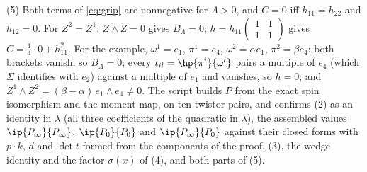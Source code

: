 (5) Both terms of \eqref{eq:grip} are nonnegative for $\Lambda > 0$, and $C = 0$ iff $h_{11} = h_{22}$ and $h_{12} = 0$. For $Z^{2} = Z^{1}$: $Z\wedge Z = 0$ gives $B_{\Lambda} = 0$; $h = h_{11}\left(\begin{smallmatrix}1&1\\1&1\end{smallmatrix}\right)$ gives $C = \tfrac14\cdot 0 + h_{11}^{2}$. For the example, $\omega^{1} = e_{1}$, $\pi^{1} = e_{4}$, $\omega^{2} = \alpha e_{1}$, $\pi^{2} = \beta e_{4}$: both brackets vanish, so $B_{\Lambda} = 0$; every $t_{il} = \hp{\pi^{i}}{\omega^{l}}$ pairs a multiple of $e_{4}$ (which $\Sigma$ identifies with $e_{2}$) against a multiple of $e_{1}$ and vanishes, so $h = 0$; and $Z^{1}\wedge Z^{2} = (\beta - \alpha)\,e_{1}\wedge e_{4} \neq 0$. The script builds $P$ from the exact spin isomorphism and the moment map, on ten twistor pairs, and confirms (2) as an identity in $\lambda$ (all three coefficients of the quadratic in $\lambda$), the assembled values $\ip{P_{\infty}}{P_{\infty}}$, $\ip{P_{0}}{P_{0}}$ and $\ip{P_{\infty}}{P_{0}}$ against their closed forms with $p\cdot k$, $d$ and $\det t$ formed from the components of the proof, (3), the wedge identity and the factor $\sigma(x)$ of (4), and both parts of (5).
